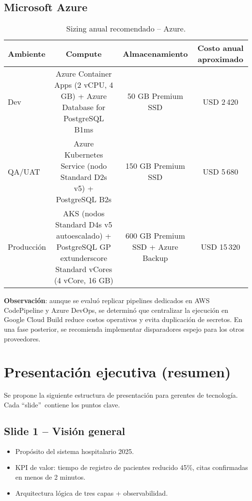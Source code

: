 \documentclass[12pt,letterpaper]{article}
\begin{document}
\subsection{Microsoft Azure}
\begin{table}[H]
  \centering
  \caption{Sizing anual recomendado -- Azure.}
  \begin{tabular}{lccc}
    \toprule
    Ambiente & Compute & Almacenamiento & Costo anual aproximado \\
    \midrule
    Dev & Azure Container Apps (2 vCPU, 4 GB) + Azure Database for PostgreSQL B1ms & 50 GB Premium SSD & USD 2\,420 \\
    QA/UAT & Azure Kubernetes Service (nodo Standard D2s v5) + PostgreSQL B2s & 150 GB Premium SSD & USD 5\,680 \\
    Producción & AKS (nodos Standard D4s v5 autoescalado) + PostgreSQL GP	extunderscore Standard vCores (4 vCore, 16 GB) & 600 GB Premium SSD + Azure Backup & USD 15\,320 \\
    \bottomrule
  \end{tabular}
\end{table}

\textbf{Observación}: aunque se evaluó replicar pipelines dedicados en AWS CodePipeline y Azure DevOps, se determinó que centralizar la ejecución en Google Cloud Build reduce costos operativos y evita duplicación de secretos. En una fase posterior, se recomienda implementar disparadores espejo para los otros proveedores.

\section{Presentación ejecutiva (resumen)}
Se propone la siguiente estructura de presentación para gerentes de tecnología. Cada \textquotedblleft slide\textquotedblright\ contiene los puntos clave.

\subsection*{Slide 1 -- Visión general}
\begin{itemize}[leftmargin=1.2cm]
  \item Propósito del sistema hospitalario 2025.
  \item KPI de valor: tiempo de registro de pacientes reducido 45\%, citas confirmadas en menos de 2 minutos.
  \item Arquitectura lógica de tres capas + observabilidad.
\end{itemize}
\end{document}
